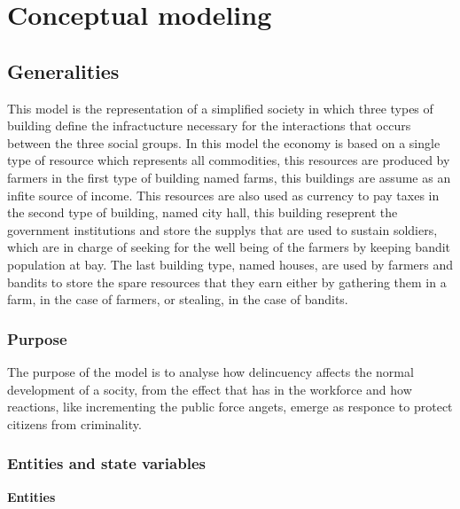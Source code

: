 \documentclass{wscpaperproc}
\begin{document}
\section{Conceptual modeling}

\subsection{Generalities}

This model is the representation of a simplified society in which three types
of building define the infractucture necessary for the interactions that occurs
between the three social groups. In this model the
economy is based on a single type of resource which represents all commodities,
this resources are produced by farmers in the first type of building named
farms, this buildings are assume as an infite source of income. This
resources are also used as currency to pay taxes in the second type of
building, named city hall, this building reseprent the government
institutions and store the supplys that are used to sustain soldiers,
which are in charge of seeking for the well being of the farmers by
keeping bandit population at bay. The last building type, named houses,
are used by farmers and bandits to store the spare resources that they
earn either by gathering them in a farm, in the case of farmers, or
stealing, in the case of bandits.

\subsubsection{Purpose}

The purpose of the model is to analyse how delincuency affects the normal
development of a socity, from the effect that has in the workforce and how
reactions, like incrementing the public force angets, emerge as responce to
protect citizens from criminality.

\subsubsection{Entities and state variables}
\noindent \textbf{Entities}
\end{document}
